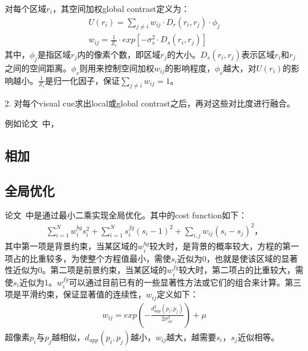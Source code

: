 \documentclass[12pt]{article}
\begin{document}
对每个区域$r_i$，其空间加权global contrast定义为：
\begin{align}
U(r_i) = \sum_{j\ne i}w_{ij} \cdot D_r(r_i, r_j) \cdot \phi_j\\
w_{ij} = \frac{1}{Z_i}\cdot exp[-\sigma_s^2 \cdot D_s(r_i, r_j)]
\end{align}
其中，$\phi_j$是指区域$r_j$内的像素个数，即区域$r_j$的大小。$D_s(r_i, r_j)$表示区域$r_i$和$r_j$之间的空间距离。$\phi_s$则用来控制空间加权$w_{ij}$的影响程度，$\phi_s$越大，对$U(r_i)$的影响越小。$\frac{1}{Z_i}$是归一化因子，保证$\sum_{j \ne i}w_{ij} = 1$。

2. 对每个visual cue求出local或global contrast之后，再对这些对比度进行融合。

例如论文~\cite{yan2013hierarchical}中，

\subsection{相加}

\subsection{全局优化}

论文~\cite{zhu2014saliency}中是通过最小二乘实现全局优化。其中的cost function如下：
\begin{align}
\sum_{i=1}^{N}w_i^{bg}s_i^2+\sum_{i=1}^{N}s_i^{fg}(s_i-1)^2+\sum_{i, j}w_{ij}(s_i-s_j)^2，
\end{align}
其中第一项是背景约束，当某区域的$w_i^{bg}$较大时，是背景的概率较大，方程的第一项占的比重较多，为使整个方程值最小，需使$s_i$近似为0，也就是使该区域的显著性近似为0。第二项是前景约束，当某区域的$w_i^{fg}$较大时，第二项占的比重较大，需使$s_i$近似为1。$w_i^{fg}$可以通过目前已有的一些显著性方法或它们的组合来计算。第三项是平滑约束，保证显著值的连续性，$w_{ij}$定义如下：
\begin{align}
w_{ij} = exp(-\frac{d_{app}^2(p_i, p_j)}{2\sigma_{clr}^2})+\mu
\end{align}
超像素$p_i$与$p_j$越相似，$d_{app}(p_i, p_j)$越小，$w_{ij} $越大，越需要$s_i$，$s_j$近似相等。
%


\end{document}
